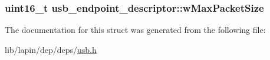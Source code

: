 \hypertarget{structusb__endpoint__descriptor_a0b665a4fbe5daf9ede7ae18d75e1c744}{
\subsubsection[{w\-Max\-Packet\-Size}]{\setlength{\rightskip}{0pt plus 5cm}uint16\-\_\-t usb\-\_\-endpoint\-\_\-descriptor\-::w\-Max\-Packet\-Size}}\label{structusb__endpoint__descriptor_a0b665a4fbe5daf9ede7ae18d75e1c744}


The documentation for this struct was generated from the following file\-:\begin{DoxyCompactItemize}
\item 
lib/lapin/dep/deps/\hyperlink{deps_2usb_8h}{usb.\-h}\end{DoxyCompactItemize}

